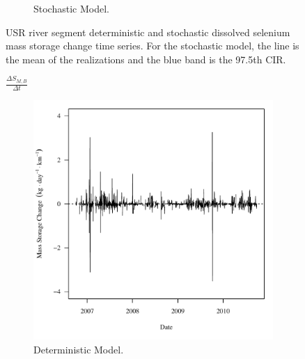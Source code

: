 \begin{linenumbers}
\begin{landscape}
\begin{figure}
\begin{subfigure}{0.7\textwidth}
			\caption{Stochastic Model.}
		\end{subfigure}
		\caption[USR river segment deterministic and stochastic dissolved selenium mass storage change time series.]{USR river segment deterministic and stochastic dissolved selenium mass storage change time series.  For the stochastic model, the line is the mean of the realizations and the blue band is the 97.5th CIR.}
		\label{fig:massSegmentStoreChange_USR}
	\end{figure}
\end{landscape}

\subfiguremid
\begin{landscape}
	\begin{figure}
		$ \displaystyle \frac{\Delta S_{M,B}}{\Delta t} $
		\begin{subfigure}{0.7\textwidth}
			\centering
			\includegraphics[width=\tableCustomSize]{"Figures/Results_USR/Deterministic/f Segment B"}
			\caption{Deterministic Model.}
		\end{subfigure}%
		\begin{subfigure}{0.7\textwidth}
			\centering

\end{subfigure}
\end{figure}
\end{landscape}
\end{linenumbers}
